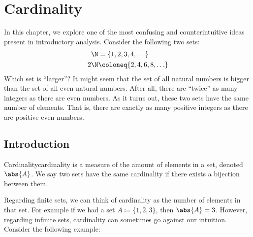\chapter{Cardinality}

In this chapter, we explore one of the most confusing and counterintuitive ideas present in introductory analysis. Consider the following two sets:
\begin{align*}
    \N &= \{1, 2, 3, 4, \ldots \} \\
    2\N &\coloneq \{2, 4, 6, 8, \ldots \}
\end{align*}
Which set is ``larger''? It might seem that the set of all natural numbers is bigger than the set of all even natural numbers. After all, there are ``twice'' as many integers as there are even numbers. As it turns out, these two sets have the same number of elements. That is, there are exactly as many positive integers as there are positive even numbers.

\section{Introduction}

\begin{dfnbox}{Cardinality}{cardinality}
     is a measure of the amount of elements in a set, denoted $\abs{A}$. We say two sets have the same cardinality if there exists a bijection between them.
\end{dfnbox}

Regarding finite sets, we can think of cardinality as the number of elements in that set. For example if we had a set $ A \coloneq \{1,2,3\}$, then $\abs{A} = 3$. However, regarding infinite sets, cardinality can sometimes go against our intuition. Consider the following example:


